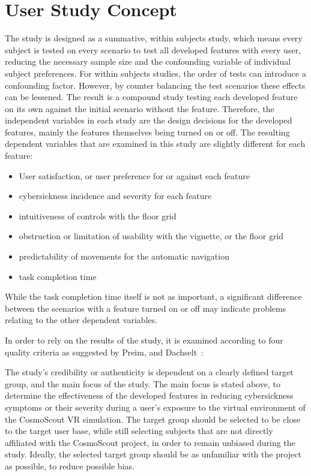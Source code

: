 \section{User Study Concept}\label{sec:user-study-concept}

The study is designed as a summative, within subjects study, which means every subject is tested on every scenario to
test all developed features with every user, reducing the necessary sample size and the confounding variable of
individual subject preferences.
For within subjects studies, the order of tests can introduce a confounding factor.
However, by counter balancing the test scenarios these effects can be lessened.
The result is a compound study testing each developed feature on its own against the initial scenario without the
feature.
Therefore, the independent variables in each study are the design decisions for the developed features, mainly the
features themselves being turned on or off.
The resulting dependent variables that are examined in this study are slightly different for each feature:
\newpage
\begin{itemize}
    \item User satisfaction, or user preference for or against each feature
    \item cybersickness incidence and severity for each feature
    \item intuitiveness of controls with the floor grid
    \item obstruction or limitation of usability with the vignette, or the floor grid
    \item predictability of movements for the automatic navigation
    \item task completion time
\end{itemize}
While the task completion time itself is not as important, a significant difference between the scenarios with a
feature turned on or off may indicate problems relating to the other dependent variables.

In order to rely on the results of the study, it is examined according to four quality criteria as suggested
by Preim, and Dachselt~\cite{Preim2015}:

The study's credibility or authenticity is dependent on a clearly defined target group, and the main focus of the study.
The main focus is stated above, to determine the effectiveness of the developed features in reducing cybersickness
symptoms or their severity during a user's exposure to the virtual environment of the CosmoScout VR
simulation.
The target group should be selected to be close to the target user base, while still selecting subjects that are not
directly affiliated with the CosmoScout project, in order to remain unbiased during the study.
Ideally, the selected target group should be as unfamiliar with the project as possible, to reduce possible bias.

